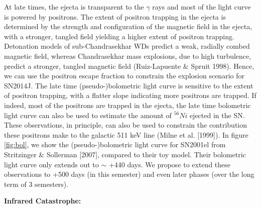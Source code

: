 \documentclass[11pt]{article}
\begin{document}
{At late times, the ejecta is transparent to the $\gamma$ rays and most of the light curve is powered by positrons. The extent of positron trapping in the ejecta is determined by the strength and configuration of the magnetic field in the ejecta, with a stronger, tangled field yielding a higher extent of positron trapping. Detonation models of sub-Chandrasekhar WDs predict a weak, radially combed magnetic field, whereas Chandrasekhar mass explosions, due to high turbulence, predict a  stronger, tangled magnetic field (Ruiz-Lapuente $\&$ Spruit 1998). Hence, we can use the positron escape fraction to constrain the explosion scenario for SN2014J. The late time (pseudo-)bolometric light curve is sensitive to the extent of positron trapping, with a flatter slope indicating more positrons are trapped. If indeed, most of the positrons are trapped in the ejecta, the late time bolometric light curve can also be used to estimate the amount of $^{56}Ni$ ejected in the SN. These observations, in principle, can also be used to constrain the contribution these positrons make to the galactic 511 keV line (Milne et al. [1999]).  In figure \ref{fig:bol}, we show the (pseudo-)bolometric light curve for SN2001el from Stritzinger $\&$ Sollerman [2007], compared to their toy model. Their bolometric light curve only extends out to $\sim$  +440 days. We propose to extend these observations to +500 days (in this semester) and even later phases (over the long term of 3 semesters). 

\textbf{Infrared Catastrophe:}

}
\end{document}
